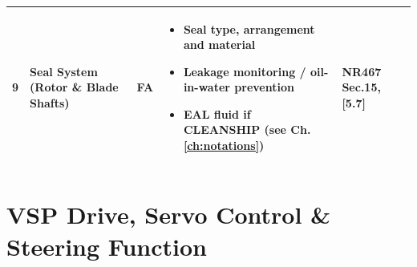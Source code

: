 \documentclass[11pt,a4paper]{report}
\newcommand{\fa}{\textbf{\textcolor{warningred}{FA}}}
\begin{document}
\begin{longtable}{|p{0.5cm}|p{5cm}|p{1.5cm}|p{5.5cm}|p{2cm}|}
9 & Seal System (Rotor \& Blade Shafts) & \fa{} &
\begin{itemize}[leftmargin=*,nosep]
\item Seal type, arrangement and material
\item Leakage monitoring / oil-in-water prevention
\item EAL fluid if CLEANSHIP (see Ch.\ref{ch:notations})
\end{itemize} & NR467 Sec.15, [5.7] \\
\hline

\end{longtable}

\section{VSP Drive, Servo Control \& Steering Function}
\end{document}
